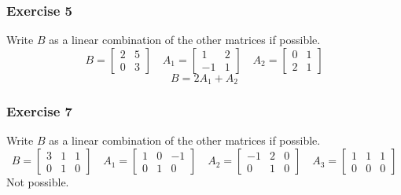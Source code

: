 \documentclass[letterpaper, 12pt]{math}
\begin{document}
\subsubsection*{Exercise 5}
Write \( B \) as a linear combination of the other matrices if possible.
\[ B = \begin{bmatrix}2 & 5 \\ 0 & 3\end{bmatrix} \quad
  A_1 = \begin{bmatrix}1 & 2 \\ -1 & 1\end{bmatrix} \quad
  A_2 = \begin{bmatrix}0 & 1 \\ 2 & 1\end{bmatrix} \]
\[ B = 2A_1+A_2 \]

\subsubsection*{Exercise 7}
Write \( B \) as a linear combination of the other matrices if possible.
\[ B = \begin{bmatrix}3 & 1 & 1 \\ 0 & 1 & 0\end{bmatrix} \quad
  A_1 = \begin{bmatrix}1 & 0 & -1 \\ 0 & 1 & 0\end{bmatrix} \quad
  A_2 = \begin{bmatrix}-1 & 2 & 0 \\ 0 & 1 & 0\end{bmatrix} \quad
  A_3 = \begin{bmatrix}1 & 1 & 1 \\ 0 & 0 & 0\end{bmatrix} \]
Not possible.
\end{document}
